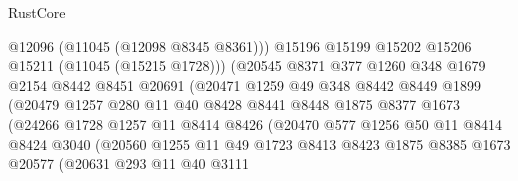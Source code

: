\begin{lexlean}{RustCore}
\begin{coremodule}
                              @12096
                              (@11045 (@12098 @8345 @8361)))
                            @15196
                            @15199
                            @15202
                            @15206
                            @15211
                            (@11045 (@15215 @1728)))
                          (@20545
                            @8371
                            @377
                            @1260
                            @348
                            @1679
                            @2154
                            @8442
                            @8451
                            @20691
                            (@20471
                              @1259
                              @49
                              @348
                              @8442
                              @8449
                              @1899
                              (@20479
                                @1257
                                @280
                                @11
                                @40
                                @8428
                                @8441
                                @8448
                                @1875
                                @8377
                                @1673
                                (@24266
                                  @1728
                                  @1257
                                  @11
                                  @8414
                                  @8426
                                  (@20470
                                    @577
                                    @1256
                                    @50
                                    @11
                                    @8414
                                    @8424
                                    @3040
                                    (@20560
                                      @1255
                                      @11
                                      @49
                                      @1723
                                      @8413
                                      @8423
                                      @1875
                                      @8385
                                      @1673
                                      @20577
                                      (@20631
                                        @293
                                        @11
                                        @40
                                        @3111

\end{coremodule}
\end{lexlean}
